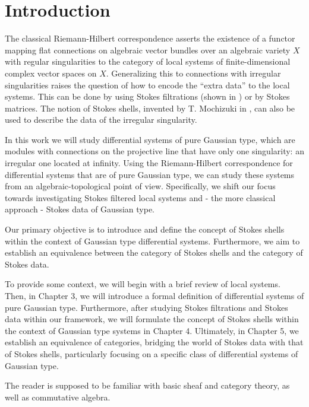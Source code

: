 \chapter{Introduction}

The classical Riemann-Hilbert correspondence asserts the existence of a functor mapping flat connections on algebraic vector bundles over an algebraic variety $X$ with regular singularities to the category of local systems of finite-dimensional complex vector spaces on $X$. 
Generalizing this to connections with irregular singularities raises the question of how to encode the ``extra data'' to the local systems. This can be done by using Stokes filtrations (shown in \cite{Sabbah_StokesStructures}) or by Stokes matrices. The notion of Stokes shells, invented by T. Mochizuki in \cite{mochistokes}, can also be used to describe the data of the irregular singularity.
\newline

In this work we will study differential systems of pure Gaussian type, which are modules with connections on the projective line that have only one singularity: an irregular one located at infinity. Using the Riemann-Hilbert correspondence for differential systems that are of pure Gaussian type, we can study these systems from an algebraic-topological point of view. Specifically, we shift our focus towards investigating Stokes filtered local systems and - the more classical approach - Stokes data of Gaussian type. 

Our primary objective is to introduce and define the concept of Stokes shells within the context of Gaussian type differential systems. Furthermore, we aim to establish an equivalence between the category of Stokes shells and the category of Stokes data. 

To provide some context, we will begin with a brief review of local systems. Then, in Chapter 3, we will introduce a formal definition of differential systems of pure Gaussian type. Furthermore, after studying Stokes filtrations and Stokes data within our framework, we will formulate the concept of Stokes shells within the context of Gaussian type systems in Chapter 4. Ultimately, in Chapter 5, we establish an equivalence of categories, bridging the world of Stokes data with that of Stokes shells, particularly focusing on a specific class of differential systems of Gaussian type.
\newline

The reader is supposed to be familiar with basic sheaf and category theory, as well as commutative algebra.
